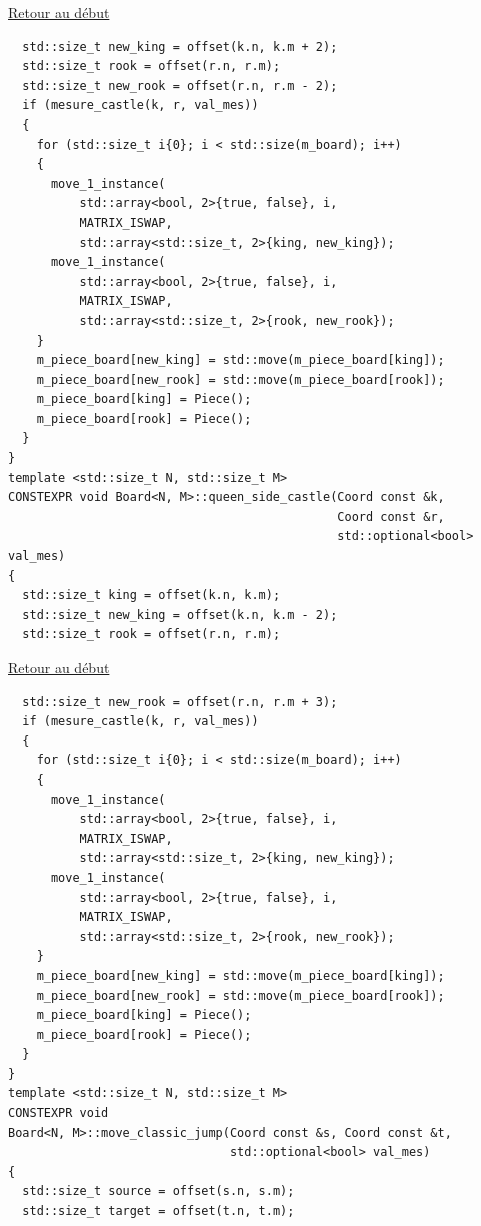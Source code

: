{\begin{frame}[fragile]
\hyperlink{conclusion}{Retour au début}\newline
\begin{verbatim}
  std::size_t new_king = offset(k.n, k.m + 2);
  std::size_t rook = offset(r.n, r.m);
  std::size_t new_rook = offset(r.n, r.m - 2);
  if (mesure_castle(k, r, val_mes))
  {
    for (std::size_t i{0}; i < std::size(m_board); i++)
    {
      move_1_instance(
          std::array<bool, 2>{true, false}, i,
          MATRIX_ISWAP,
          std::array<std::size_t, 2>{king, new_king});
      move_1_instance(
          std::array<bool, 2>{true, false}, i,
          MATRIX_ISWAP,
          std::array<std::size_t, 2>{rook, new_rook});
    }
    m_piece_board[new_king] = std::move(m_piece_board[king]);
    m_piece_board[new_rook] = std::move(m_piece_board[rook]);
    m_piece_board[king] = Piece();
    m_piece_board[rook] = Piece();
  }
}
template <std::size_t N, std::size_t M>
CONSTEXPR void Board<N, M>::queen_side_castle(Coord const &k,
                                              Coord const &r,
                                              std::optional<bool> val_mes)
{
  std::size_t king = offset(k.n, k.m);
  std::size_t new_king = offset(k.n, k.m - 2);
  std::size_t rook = offset(r.n, r.m);
\end{verbatim}
\end{frame}

\begin{frame}[fragile]
\hyperlink{conclusion}{Retour au début}\newline
\begin{verbatim}
  std::size_t new_rook = offset(r.n, r.m + 3);
  if (mesure_castle(k, r, val_mes))
  {
    for (std::size_t i{0}; i < std::size(m_board); i++)
    {
      move_1_instance(
          std::array<bool, 2>{true, false}, i,
          MATRIX_ISWAP,
          std::array<std::size_t, 2>{king, new_king});
      move_1_instance(
          std::array<bool, 2>{true, false}, i,
          MATRIX_ISWAP,
          std::array<std::size_t, 2>{rook, new_rook});
    }
    m_piece_board[new_king] = std::move(m_piece_board[king]);
    m_piece_board[new_rook] = std::move(m_piece_board[rook]);
    m_piece_board[king] = Piece();
    m_piece_board[rook] = Piece();
  }
}
template <std::size_t N, std::size_t M>
CONSTEXPR void
Board<N, M>::move_classic_jump(Coord const &s, Coord const &t,
                               std::optional<bool> val_mes)
{
  std::size_t source = offset(s.n, s.m);
  std::size_t target = offset(t.n, t.m);


\end{verbatim}
\end{frame}}
